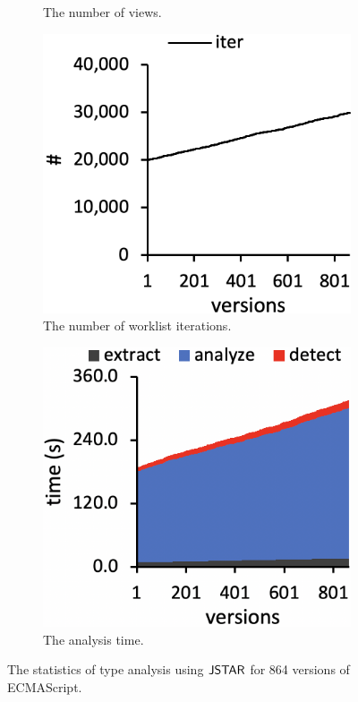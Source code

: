 \begin{figure}
\begin{subfigure}[b]{0.24\textwidth}
    \caption{The number of views.}
  \end{subfigure}
  \begin{subfigure}[b]{0.24\textwidth}
    \includegraphics[width=\textwidth]{img/iter}
    \caption{The number of worklist iterations.}
  \end{subfigure}
  \begin{subfigure}[b]{0.24\textwidth}
    \includegraphics[width=\textwidth]{img/time}
    \caption{The analysis time.}
  \end{subfigure}
  \caption{The statistics of type analysis using $\tool$ for 864 versions of
  ECMAScript.}
  \vspace*{-1.5em}
  \label{fig:stat}
\end{figure}

